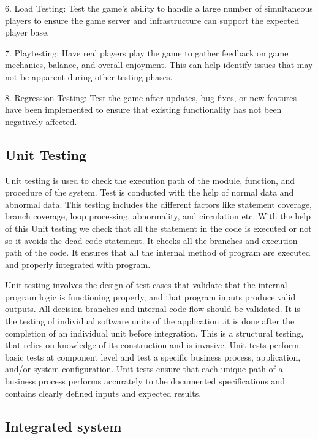 \documentclass[12pt]{report}
\begin{document}
6. Load Testing:
Test the game's ability to handle a large number of simultaneous players to ensure the game server and infrastructure can support the expected player base.

7. Playtesting:
Have real players play the game to gather feedback on game mechanics, balance, and overall enjoyment. This can help identify issues that may not be apparent during other testing phases.

8. Regression Testing:
Test the game after updates, bug fixes, or new features have been implemented to ensure that existing functionality has not been negatively affected.



\subsection{ Unit Testing
}
\justifying
\setlength{\parindent}{4em}
\setlength{\parskip}{0.5em}
\renewcommand{\baselinestretch}{1.5}
\normalsize

Unit testing is used to check the execution path of the module, function, and procedure of 
the system. Test is conducted with the help of normal data and abnormal data. This testing 
includes the different factors like statement coverage, branch coverage, loop processing, 
abnormality, and circulation etc. With the help of this Unit testing we check that all the 
statement in the code is executed or not so it avoids the dead code statement. It checks all 
the branches and execution path of the code. It ensures that all the internal method of 
program are executed and properly integrated with program.

Unit testing involves the design of test cases that validate that the internal program logic is 
functioning properly, and that program inputs produce valid outputs. All decision branches 
and internal code flow should be validated. It is the testing of individual software units of 
the application .it is done after the completion of an individual unit before integration. This 
is a structural testing, that relies on knowledge of its construction and is invasive. Unit tests 
perform basic tests at component level and test a specific business process, application, 
and/or system configuration. Unit tests ensure that each unique path of a business process 
performs accurately to the documented specifications and contains clearly defined inputs 
and expected results.

\subsection{Integrated system}
\justifying
\setlength{\parindent}{4em}
\setlength{\parskip}{0.5em}
\renewcommand{\baselinestretch}{1.5}
\normalsize
\end{document}
